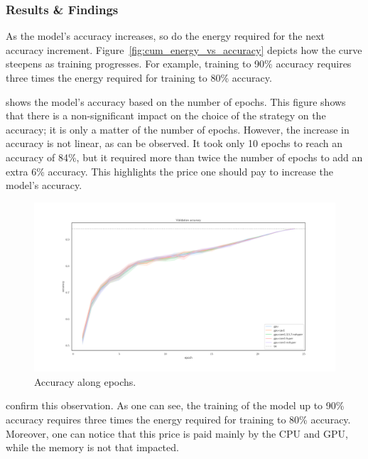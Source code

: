 \subsubsection{Results \& Findings}
As the model's accuracy increases, so do the energy required for the next accuracy increment.
Figure~\ref{fig:cum_energy_vs_accuracy} depicts how the curve steepens as training progresses.
For example, training to 90\% accuracy requires three times the energy required for training to 80\% accuracy.

 shows the model's accuracy based on the number of epochs.
This figure shows that there is a non-significant impact on the choice of the strategy on the accuracy; it is only a matter of the number of epochs.
However, the increase in accuracy is not linear, as can be observed.
It took only 10 epochs to reach an accuracy of 84\%, but it required more than twice the number of epochs to add an extra 6\% accuracy.
This highlights the price one should pay to increase the model's accuracy.

\begin{figure}
    \centering
    \includegraphics[width=1.1\textwidth]{imgs/accuracy_basedonepoch}
    \caption{Accuracy along epochs.}
    \label{fig:eopochvsaccuracy}
\end{figure}

 confirm this observation.
As one can see, the training of the model up to 90\% accuracy requires three times the energy required for training to 80\% accuracy.
Moreover, one can notice that this price is paid mainly by the CPU and GPU, while the memory is not that impacted.

